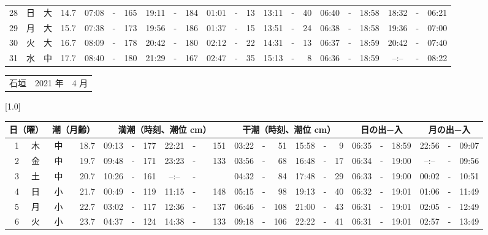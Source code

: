 \documentclass[12pt,a4j]{jsarticle}
\begin{document}
\begin{table}[htbp]
\begin{center}
{\begin{tabular}{|rc|cr|ccrccr|ccrccr|ccc|ccc|}
28 & 日 & 大 & 14.7 &  07:08 &-& 165 &  19:11 &-& 184 &  01:01 &-&  13 &  13:11 &-&  40 & 06:40 & -& 18:58 & 18:32 & -& 06:21 \\
29 & 月 & 大 & 15.7 &  07:38 &-& 173 &  19:56 &-& 186 &  01:37 &-&  15 &  13:51 &-&  24 & 06:38 & -& 18:58 & 19:36 & -& 07:00 \\
30 & 火 & 大 & 16.7 &  08:09 &-& 178 &  20:42 &-& 180 &  02:12 &-&  22 &  14:31 &-&  13 & 06:37 & -& 18:59 & 20:42 & -& 07:40 \\
31 & 水 & 中 & 17.7 &  08:40 &-& 180 &  21:29 &-& 167 &  02:47 &-&  35 &  15:13 &-&   8 & 06:36 & -& 18:59 & --:-- & -& 08:22 \\
   \hline
   \end{tabular}}
   \end{center}
\end{table}
\newpage
 \begin{table}[htbp]
 \begin{center}
 \begin{tabular}{lcc}
 \LARGE{石垣}  & \large{2021 年} & \large{ 4 月} \\
 \end{tabular}
 \end{center}
 \begin{center}
    \scalebox{0.7}[1.0]{
    \begin{tabular}{|rc|cr|ccrccr|ccrccr|ccc|ccc|}
    \hline
    \multicolumn{2}{|c|}{日（曜）} & \multicolumn{2}{c|}{潮（月齢）} & \multicolumn{6}{c|}{満潮（時刻、潮位 cm）} & \multicolumn{6}{c|}{干潮（時刻、潮位 cm）} & \multicolumn{3}{c|}{日の出−入} &  \multicolumn{3}{c|}{月の出−入}\\
 \hline
 1 & 木 & 中 & 18.7 &  09:13 &-& 177 &  22:21 &-& 151 &  03:22 &-&  51 &  15:58 &-&   9 & 06:35 & -& 18:59 & 22:56 & -& 09:07 \\
 2 & 金 & 中 & 19.7 &  09:48 &-& 171 &  23:23 &-& 133 &  03:56 &-&  68 &  16:48 &-&  17 & 06:34 & -& 19:00 & --:-- & -& 09:56 \\
 3 & 土 & 中 & 20.7 &  10:26 &-& 161 &  --:-- &-&~~~~~ &  04:32 &-&  84 &  17:48 &-&  29 & 06:33 & -& 19:00 & 00:02 & -& 10:51 \\
 4 & 日 & 小 & 21.7 &  00:49 &-& 119 &  11:15 &-& 148 &  05:15 &-&  98 &  19:13 &-&  40 & 06:32 & -& 19:01 & 01:06 & -& 11:49 \\
 5 & 月 & 小 & 22.7 &  03:02 &-& 117 &  12:36 &-& 137 &  06:46 &-& 108 &  21:00 &-&  43 & 06:31 & -& 19:01 & 02:05 & -& 12:49 \\
 6 & 火 & 小 & 23.7 &  04:37 &-& 124 &  14:38 &-& 133 &  09:18 &-& 106 &  22:22 &-&  41 & 06:31 & -& 19:01 & 02:57 & -& 13:49 \\

\end{tabular}}
\end{center}
\end{table}
\end{document}
